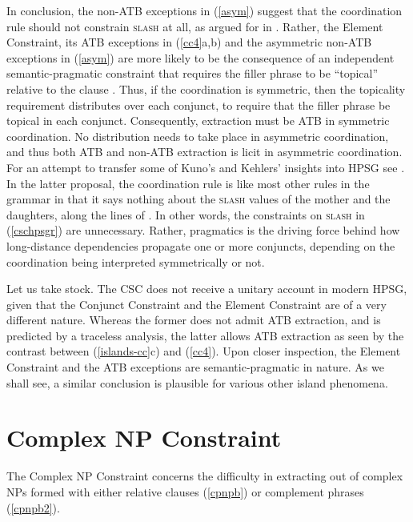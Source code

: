 \documentclass[output=paper,biblatex,babelshorthands,newtxmath,draftmode,colorlinks,citecolor=brown]{langscibook}
\begin{document}
In conclusion, the non-ATB exceptions in (\ref{asym}) suggest that the coordination rule should not
constrain \textsc{slash} at all, as argued for in \citet{chaves}.  Rather, the Element Constraint, its
ATB exceptions in (\ref{cc4}a,b) and the asymmetric non-ATB exceptions in (\ref{asym}) are more
likely to be the consequence of an independent semantic-pragmatic constraint that requires the
filler phrase to be ``topical'' relative to the clause
\citep{lakoff86,kuno87,kehler,kubotalee}. Thus, if the coordination is symmetric, then the
topicality requirement distributes over each conjunct, to require that the filler phrase be topical
in each conjunct. Consequently, extraction must be ATB in symmetric coordination. No distribution
needs to take place in asymmetric coordination, and thus both ATB and non-ATB extraction is licit in
asymmetric coordination. For an attempt to transfer some of Kuno's and Kehlers' insights into HPSG
see \citet{chaves}. In the latter proposal, the coordination rule is like most other rules in the
grammar in that it says nothing about the \textsc{slash} values of the mother and the daughters, along
the lines of \citet[354]{levhubook}. In other words, the constraints on \textsc{slash} in
(\ref{cschpsgr}) are unnecessary.  Rather, pragmatics is the driving force behind how long-distance
dependencies propagate one or more conjuncts, depending on the coordination being interpreted
symmetrically or not.  



Let us take stock. The CSC does not receive a unitary account in modern HPSG, given that the
Conjunct Constraint and the Element Constraint are of a very different nature. Whereas the former
does not admit ATB extraction, and is predicted by a traceless analysis, the latter allows ATB
extraction as seen by the contrast between (\ref{islands-cc}c) and (\ref{cc4}).  Upon closer
inspection, the Element Constraint and the ATB exceptions are semantic-pragmatic in nature.  As we
shall see, a similar conclusion is plausible for various other island phenomena.


\section{Complex NP Constraint}

The Complex NP Constraint concerns the difficulty in extracting out of complex NPs formed with
either relative clauses (\ref{cpnpb}) or complement phrases (\ref{cpnpb2}).
\end{document}
